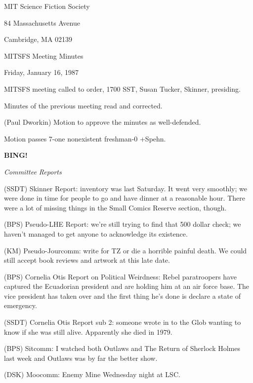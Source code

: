 \documentclass[12pt]{article}
\newcommand{\bing}{{\bf BING!} }
\newcommand{\goto}[1]{\bing \vskip 12pt \centerline{{\em{#1}}}}
\begin{document}
\begin{center}

MIT Science Fiction Society 

84 Massachusetts Avenue

Cambridge, MA 02139

\vspace{12pt}

MITSFS Meeting Minutes 

Friday, January 16, 1987

\end{center}
 
\vspace{18pt}

\setlength{\parskip}{6pt}

\noindent
MITSFS meeting called to order, 1700 SST,
Susan Tucker, Skinner, presiding.

Minutes of the previous meeting read and corrected.

(Paul Dworkin) Motion to approve the minutes as well-defended.

Motion passes 7-one nonexistent freshman-0 +Spehn.

\goto{Committee Reports}

(SSDT) Skinner Report: inventory was last Saturday. It went very smoothly; we were done in time for people to go and have dinner at a reasonable hour. There were a lot of missing things in the Small Comics Reserve section, though.

(BPS) Pseudo-LHE Report: we're still trying to find that 500 dollar check; we haven't managed to get anyone to acknowledge its existence.

(KM) Pseudo-Jourcomm: write for TZ or die a horrible painful death. We could still accept book reviews and artwork at this late date.

(BPS) Cornelia Otis Report on Political Weirdness: Rebel paratroopers have captured the Ecuadorian president and are holding him at an air force base. The vice president has taken over and the first thing he's done is declare a state of emergency.

(SSDT) Cornelia Otis Report sub 2: someone wrote in to the Glob wanting to know if she was still alive. Apparently she died in 1979.

(BPS) Sitcomm: I watched both Outlaws and The Return of Sherlock Holmes last week and Outlaws was by far the better show.

(DSK) Moocomm: Enemy Mine Wednesday night at LSC.
\end{document}
